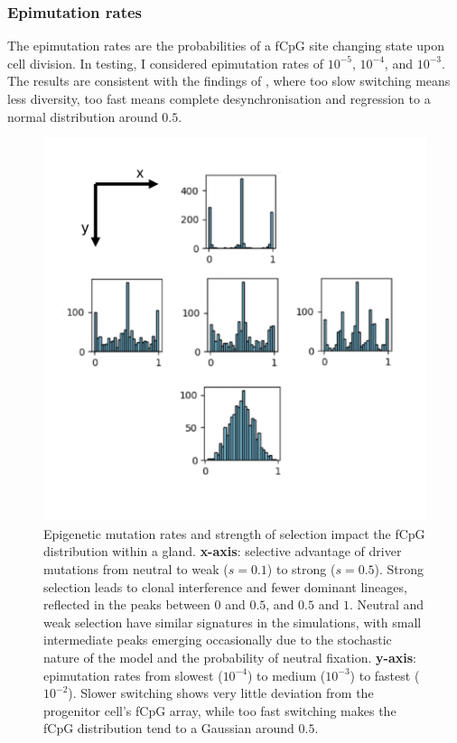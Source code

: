\subsubsection{Epimutation rates}
The epimutation rates are the probabilities of a fCpG site changing state upon
cell division. In testing, I considered epimutation rates of $10^{-5}$,
$10^{-4}$, and $10^{-3}$. The results are consistent with the findings of
\cite{gabbutt_fluctuating_2022}, where too slow switching means less diversity,
too fast means complete desynchronisation and regression to a normal
distribution around $0.5$.

\begin{figure}[h]
    \centering
    \includegraphics[width=\textwidth]{Chapter_4/figures/sens_fig_1.pdf}
    \caption{Epigenetic mutation rates and strength of selection impact the
    fCpG distribution within a gland. \textbf{x-axis}: selective advantage of
    driver mutations from neutral to weak ($s=0.1$) to strong ($s=0.5$).
    Strong selection leads to clonal interference and fewer dominant lineages,
    reflected in the peaks between $0$ and $0.5$, and $0.5$ and $1$. Neutral
    and weak selection have similar signatures in the simulations, with small
    intermediate peaks emerging occasionally due to the stochastic nature of the
    model and the probability of neutral fixation. \textbf{y-axis}: epimutation
    rates from slowest ($10^{-4}$) to medium ($10^{-3}$) to fastest ($10^{-2}$).
    Slower switching shows very little deviation from the progenitor cell's
    fCpG array, while too fast switching makes the fCpG distribution tend to a
    Gaussian around $0.5$.}
    \label{fig:sensitivity_analysis_1}
\end{figure}


